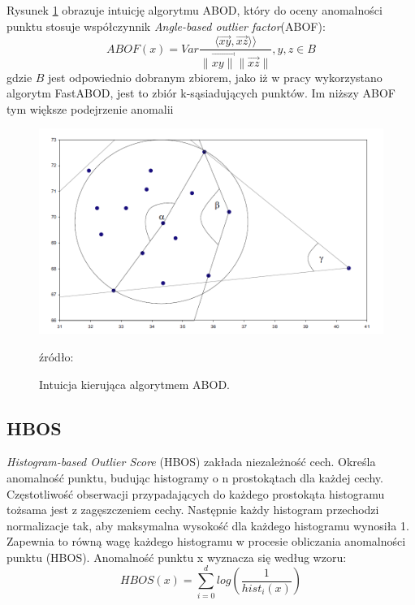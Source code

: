 Rysunek \ref{fig:abod} obrazuje intuicję algorytmu ABOD, który do oceny anomalności punktu stosuje współczynnik \textit{Angle-based outlier factor}(ABOF):
\begin{equation}
    ABOF(x) = Var\frac{\langle \overrightarrow{xy}, \overrightarrow{xz} \rangle⟩}{\big\| \overrightarrow{xy\big\|}\big\| \overrightarrow{xz}\big\|},y,z \in B
\end{equation}
gdzie $B$ jest odpowiednio dobranym zbiorem, jako iż w pracy wykorzystano algorytm FastABOD, jest to zbiór k-sąsiadujących punktów. Im niższy ABOF tym większe podejrzenie anomalii
\begin{figure}
    \centering
    \includegraphics[width=.65\textwidth]{chapters/MetaOD/images/abod.png}
    \caption{Intuicja kierująca algorytmem ABOD.}
    \footnotesize{źródło: \cite{abod}}
    \label{fig:abod}
\end{figure}

\subsection{HBOS}
\textit{Histogram-based Outlier Score} (HBOS) \cite{hbos} 
zakłada niezależność cech. Określa anomalność punktu, budując histogramy o n prostokątach
dla każdej cechy. Częstotliwość obserwacji przypadających do każdego prostokąta histogramu tożsama jest z zagęszczeniem cechy. Następnie każdy histogram przechodzi normalizacje tak, aby maksymalna wysokość dla każdego histogramu wynosiła 1. Zapewnia to równą wagę każdego histogramu w procesie obliczania anomalności punktu (HBOS). Anomalność punktu x wyznacza się według wzoru:
\begin{equation}
    HBOS(x)= \sum\limits^d_{i=0}log(\frac{1}{hist_i(x)})
\end{equation}


